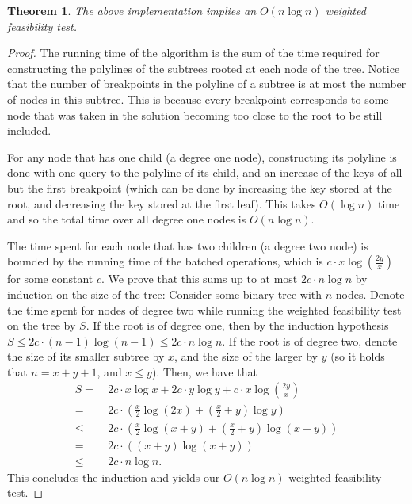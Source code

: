 \documentclass[11pt,a4paper]{article}
\newtheorem{theorem}{Theorem}[section]
\theoremstyle{definition}
\theoremstyle{remark}
\begin{document}
\begin{theorem}
\label{nlogn weighted f.t. theorem}
The above implementation implies an $O(n \log n)$ weighted feasibility test.
\end{theorem}
\begin{proof}The running time of the algorithm is the sum of the time required for constructing the polylines of the subtrees rooted at each node of the tree.
%
Notice that the number of breakpoints in the polyline of a subtree is at most the number of nodes in this subtree. This is because every breakpoint corresponds to some node that was taken in the solution becoming too close to the root to be still included.

For any node that has one child (a degree one node), constructing its polyline is done with one query to the polyline of its child, and an increase of the keys of all but the first breakpoint (which can be done by increasing the key stored at the root, and decreasing the key stored at the first leaf). This takes $O(\log n)$ time and so the total time over all degree one nodes is $O(n \log n)$.
 
The time spent for each node that has two children (a degree two node) is bounded by the running time of the batched operations, which is $c\cdot x \log (\frac{2y}{x})$ for some constant $c$. We prove that this sums up to at most $2c \cdot n \log n$ by induction on the size of the  tree: Consider some binary tree with $n$ nodes. Denote the time spent for nodes of degree two while running the weighted feasibility test on the tree by $S$. If the root is of degree one, then by the induction hypothesis $S \leq 2c\cdot (n-1)\log(n-1)\leq 2c\cdot n \log n$. If the root is of degree two, denote the size of its smaller subtree by $x$, and the size of the larger by $y$ (so it holds that $n=x+y+1$, and $x \leq y$). Then, we have that
\begin{align*}
S = & \ 2c\cdot x \log x + 2c\cdot y \log y + c\cdot x \log (\frac{2y}{x})\\
= & \ 2c\cdot (\frac{x}{2}\log(2x)+(\frac{x}{2}+y)\log y) \\
\leq & \ 2c\cdot (\frac{x}{2}\log(x+y)+(\frac{x}{2}+y)\log (x+y)) \\
= & \ 2c\cdot ((x+y)\log(x+y)) \\
\leq & \ 2c\cdot n \log n.
\end{align*}
This concludes the induction and yields our $O(n \log n)$ weighted feasibility test.
\end{proof}





\end{document}
